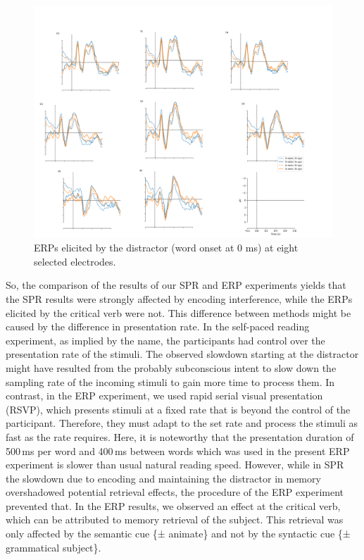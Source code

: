 \documentclass[a4paper, man, floatsintext]{apa7}
\begin{document}
\begin{figure}[H]
    \centering
        \caption{ERPs elicited by the distractor (word onset at 0 ms) at eight selected electrodes.}
    \label{fig:erp_distractor}\includegraphics[width=\textwidth]{images/Distractor_N_100_some_elec.png}
\end{figure}

So, the comparison of the results of our SPR and ERP experiments yields that the SPR results were strongly affected by encoding interference, while the ERPs elicited by the critical verb were not. This difference between methods might be caused by the difference in presentation rate. In the self-paced reading experiment, as implied by the name, the participants had control over the presentation rate of the stimuli. The observed slowdown starting at the distractor  might have resulted from the probably subconscious intent to slow down the sampling rate of the incoming stimuli to gain more time to process them. In contrast, in the ERP experiment, we used rapid serial visual presentation (RSVP), which presents stimuli at a fixed rate that is beyond the control of the participant. Therefore, they must adapt to the set rate and process the stimuli as fast as the rate requires. Here, it is noteworthy that the presentation duration of 500\,ms per word and 400\,ms between words which was used in the present ERP experiment is slower than usual natural reading speed. However, while in SPR the slowdown due to encoding and maintaining the distractor in memory overshadowed potential retrieval effects, the procedure of the ERP experiment prevented that. In the ERP results, we observed an effect at the critical verb, which can be attributed to memory retrieval of the subject. This retrieval was only affected by the semantic cue \{± animate\} and not by the syntactic cue \{± grammatical subject\}. 
\end{document}
